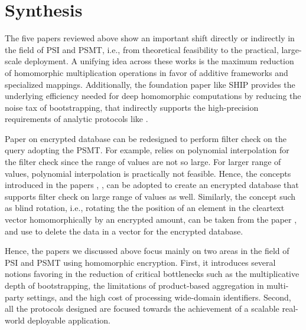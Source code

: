 \documentclass[12pt]{article}
\begin{document}
\section{Synthesis}
The five papers reviewed above show an important shift directly or indirectly in the field of PSI and PSMT, i.e., from theoretical feasibility to the practical, large-scale deployment. A unifying idea across these works is the maximum reduction of homomorphic multiplication operations in favor of additive frameworks and specialized mappings. Additionally, the foundation paper like SHIP \cite{cheon2025ship} provides the underlying efficiency needed for deep homomorphic computations by reducing the noise tax of bootstrapping, that indirectly supports the high-precision requirements of analytic protocols like \cite{koirala2025select}.

Paper \cite{blindenbach2024squid} on encrypted database can be redesigned to perform filter check on the query adopting the PSMT. For example, \cite{blindenbach2024squid} relies on polynomial interpolation for the filter check since the range of values are not so large. For larger range of values, polynomial interpolation is practically not feasible. Hence, the concepts introduced in the papers \cite{koirala2025psmt}, \cite{koirala2025select}, \cite{paik2025scalable} can be adopted to create an encrypted database that supports filter check on large range of values as well. Similarly, the concept such as blind rotation, i.e., rotating the the position of an element in the cleartext vector homomorphically by an encrypted amount, can be taken from the paper \cite{cheon2025ship}, and use to delete the data in a vector for the encrypted database. 

Hence, the papers we discussed above focus mainly on two areas in the field of PSI and PSMT using homomorphic encryption. First, it introduces several notions favoring in the reduction of critical bottlenecks such as the multiplicative depth of bootstrapping, the limitations of product-based aggregation in multi-party settings, and the high cost of processing wide-domain identifiers. Second, all the protocols designed are focused towards the achievement of a scalable real-world deployable application.



\end{document}
